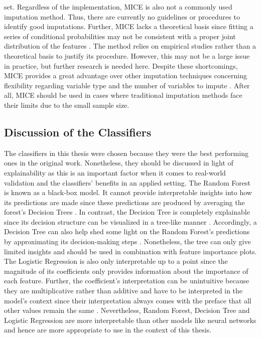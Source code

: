 set.
Regardless of the implementation, MICE is also not a commonly used imputation 
method. Thus, there are currently no guidelines or procedures to identify 
good imputations. Further, MICE lacks a theoretical basis since fitting a 
series of conditional probabilities may not be consistent with a proper joint 
distribution of the features \cite{RN141}. The method relies on empirical 
studies rather than a 
theoretical basis to justify its procedure. However, this may not be a large 
issue in practice, but further research is needed here. Despite these 
shortcomings, MICE 
provides a great advantage over other imputation techniques concerning 
flexibility regarding variable type and the number of variables to impute 
\cite{RN141, RN142}. After all, MICE should be used in cases where traditional 
imputation methods face their limits due to the small sample size.
\subsection{Discussion of the Classifiers}
\label{sec:classifiers}
The classifiers in this thesis were chosen because they were the best performing 
ones in the original work. Nonetheless, they should be discussed in light of 
explainability as this is an important factor when it comes to real-world 
validation and the classifiers' benefits in an applied setting.
The Random Forest is known as a black-box model. It cannot provide 
interpretable insights into how its predictions are made since these 
predictions are produced by averaging the forest’s Decision Trees \cite{RN163}. 
In contrast, the Decision Tree is completely explainable since its decision 
structure can be visualized in a tree-like manner \cite{RN171}. Accordingly, a 
Decision Tree can also help shed some light on the Random Forest’s predictions 
by approximating its decision-making steps \cite{RN210}. Nonetheless, the tree 
can only give limited insights and should be used in combination with feature 
importance plots. The Logistic Regression is also only interpretable up to a 
point since the magnitude of its coefficients only provides information about 
the importance of each feature. Further, the coefficient's interpretation can be 
unintuitive because they are multiplicative rather than additive and have to be 
interpreted in the model's context since their interpretation always comes with 
the preface that all other values remain the same \cite{RN174}. Nevertheless, 
Random Forest, Decision Tree and Logistic 
Regression are more interpretable than other models like neural networks and 
hence are more appropriate to use in the context of this thesis.
